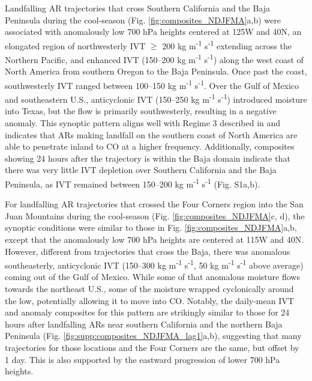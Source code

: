 \documentclass[draft]{agujournal2019}
\begin{document}
Landfalling AR trajectories that cross Southern California and the Baja Peninsula during the cool-season (Fig. \ref{fig:composites_NDJFMA}a,b) were associated with anomalously low 700 hPa heights centered at 125\textdegree W and 40\textdegree N, an elongated region of northwesterly IVT $\geq$ 200 kg m\textsuperscript{-1} s\textsuperscript{-1} extending across the Northern Pacific, and enhanced IVT (150--200 kg m\textsuperscript{-1} s\textsuperscript{-1}) along the west coast of North America from southern Oregon to the Baja Peninsula. Once past the coast, southwesterly IVT ranged between 100--150 kg m\textsuperscript{-1} s\textsuperscript{-1}. Over the Gulf of Mexico and southeastern U.S., anticyclonic IVT (150--250 kg m\textsuperscript{-1} s\textsuperscript{-1}) introduced moisture into Texas, but the flow is primarily southwesterly, resulting in a negative anomaly. This synoptic pattern aligns well with Regime 3 described in  and indicates that ARs making landfall on the southern coast of North America are able to penetrate inland to CO at a higher frequency. Additionally, composites showing 24 hours after the trajectory is within the Baja domain indicate that there was very little IVT depletion over Southern California and the Baja Peninsula, as IVT remained between 150--200 kg m\textsuperscript{-1} s\textsuperscript{-1} (Fig. S1a,b). 



For landfalling AR trajectories that crossed the Four Corners region into the San Juan Mountains during the cool-season (Fig. \ref{fig:composites_NDJFMA}c, d), the synoptic conditions were similar to those in Fig. \ref{fig:composites_NDJFMA}a,b, except that the anomalously low 700 hPa heights are centered at 115\textdegree W and 40\textdegree N. However, different from trajectories that cross the Baja, there was anomalous southeasterly, anticyclonic IVT (150--300 kg m\textsuperscript{-1} s\textsuperscript{-1}, 50 kg m\textsuperscript{-1} s\textsuperscript{-1} above average) coming out of the Gulf of Mexico. While some of that anomalous moisture flows towards the northeast U.S., some of the moisture wrapped cyclonically around the low, potentially allowing it to move into CO. Notably, the daily-mean IVT and anomaly composites for this pattern are strikingly similar to those for 24 hours after landfalling ARs near southern California and the northern Baja Peninsula (Fig. \ref{fig:supp:composites_NDJFMA_lag1}a,b), suggesting that many trajectories for those locations and the Four Corners are the same, but offset by $~$1 day. This is also supported by the eastward progression of lower 700 hPa heights.
\end{document}
